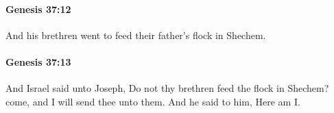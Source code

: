 		\paragraph{Genesis 37:12} %
			\label{GENESIS-37-12}

			And his brethren went to feed their father's flock in Shechem.


		\paragraph{Genesis 37:13} %
			\label{GENESIS-37-13}

			And Israel said unto Joseph, Do not thy brethren feed the flock in Shechem? come, and I will send thee unto them. And he said to him, Here am I.


